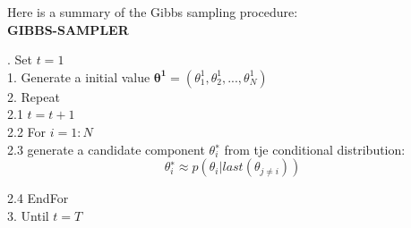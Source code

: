 Here is a summary of the Gibbs sampling procedure: \\
{\bf GIBBS-SAMPLER }\\[.4cm]
{. \hspace*{0.2cm} Set $t=1$  \\
1. \hspace*{0.2cm} Generate a initial value $\mathbf{\theta^1}=(\theta_1^1, \theta_2^1 , . . . ,\theta_N^1 )$\\
2. \hspace*{0.2cm}  Repeat\\
2.1 \hspace*{0.3cm} $t=t+1$\\
2.2 \hspace*{0.3cm}  For $i=1:N$\\
2.3 \hspace*{0.4cm} generate a candidate component $\theta_i^∗$ from tje conditional distribution:
$$
\theta_i^∗ \approx p( \theta_i | last(\theta_{j\neq i}) )
$$

2.4 \hspace*{0.3cm}  EndFor \\
3.\hspace*{0.2cm} Until $t = T$\\
}\\[.4cm]
\\
\\

